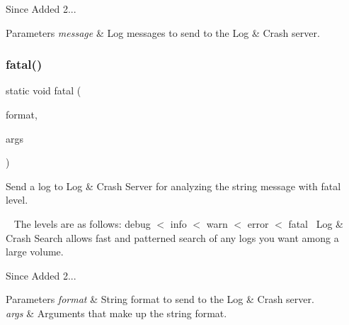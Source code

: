 \begin{DoxySince}{Since}
Added 2... 
\end{DoxySince}

\begin{DoxyParams}{Parameters}
{\em message} & Log messages to send to the Log \& Crash server. \\
\hline
\end{DoxyParams}
\mbox{\label{classcom_1_1toast_1_1android_1_1gamebase_1_1_gamebase_1_1_logger_afc5d2b7e19013fcd0baf573751179b8a}} 
\subsubsection{\texorpdfstring{fatal()}{fatal()}\hspace{0.1cm}{\footnotesize\ttfamily [2/3]}}
{\footnotesize\ttfamily static void fatal (\begin{DoxyParamCaption}\item[{@Non\+Null final String}]{format,  }\item[{@Non\+Null final Object...}]{args }\end{DoxyParamCaption})\hspace{0.3cm}{\ttfamily [static]}}



Send a log to Log \& Crash Server for analyzing the string message with fatal level. 

~\newline
 The levels are as follows\+: debug $<$ info $<$ warn $<$ error $<$ fatal~\newline
 Log \& Crash Search allows fast and patterned search of any logs you want among a large volume.

\begin{DoxySince}{Since}
Added 2... 
\end{DoxySince}

\begin{DoxyParams}{Parameters}
{\em format} & String format to send to the Log \& Crash server. \\
\hline
{\em args} & Arguments that make up the string format. \\
\hline
\end{DoxyParams}
\mbox{\label{classcom_1_1toast_1_1android_1_1gamebase_1_1_gamebase_1_1_logger_ad9c45ca92a20a6a59675f24cb62bcd78}} 

